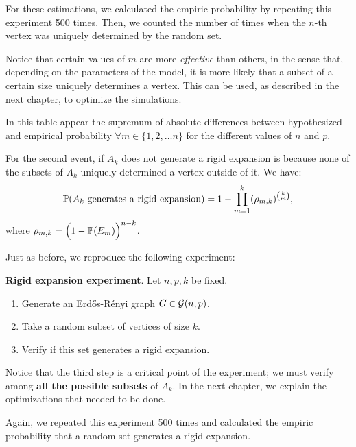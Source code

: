 For these estimations, we calculated the empiric probability by repeating this experiment 500 times. Then, we counted the number of times when the $n$-th vertex was uniquely determined by the random set.

Notice that certain values of $m$ are more \textit{effective} than others, in the sense that, depending on the parameters of the model, it is more likely that a subset of a certain size uniquely determines a vertex. This can be used, as described in the next chapter, to optimize the simulations.

In this table appear the supremum of absolute differences between hypothesized and empirical probability $\forall m \in \{1,2, \dots n\}$ for the different values of $n$ and $p$.

\vspace{0.3cm} 

\vspace{-0.3cm}

For the second event, if $A_k$ does not generate a rigid expansion is because none of the subsets of $A_{k}$ uniquely determined a vertex outside of it. We have:
$$\P(A_k \text{ generates a rigid expansion}) = 1 -  \prod_{m=1}^{k} (\rho_{m,k})^{\binom{k}{m}},$$
where $\rho_{m,k} = \Big(1 - \P(E_m)\Big)^{n-k}$.

Just as before, we reproduce the following experiment:
 
\begin{cajita}
\textbf{Rigid expansion experiment}. Let $n,p,k$ be fixed.
\begin{enumerate}
\item Generate an Erdős-Rényi graph $G\in \G(n,p)$.
\item Take a random subset of vertices of size $k$.
\item Verify if this set generates a rigid expansion.
\end{enumerate}
\end{cajita}

Notice that the third step is a critical point of the experiment; we must verify among \textbf{all the possible subsets} of $A_{k}$. In the next chapter, we explain the optimizations that needed to be done.

Again, we repeated this experiment 500 times and calculated the empiric probability that a random set generates a rigid expansion.

